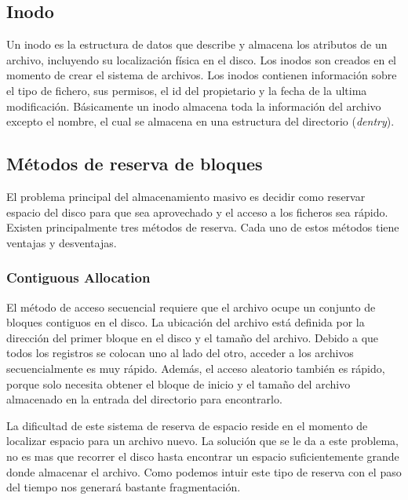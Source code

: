 \subsection{Inodo}
Un inodo es la estructura de datos que describe y almacena los atributos de un archivo, incluyendo su localización física en el disco. Los inodos son creados en el momento de crear el sistema de archivos. Los inodos contienen información sobre  el tipo de fichero, sus permisos, el id del propietario y la fecha de la ultima modificación. Básicamente un inodo almacena toda la información del archivo excepto el nombre, el cual se almacena en una estructura del directorio (\textit{dentry}).

\subsection{Métodos de reserva de bloques}
El problema principal del almacenamiento masivo es decidir como reservar espacio del disco para que sea aprovechado y el acceso a los ficheros sea rápido. Existen principalmente tres métodos de reserva. Cada uno de estos métodos tiene ventajas y desventajas. \cite{silberchatz}
\subsubsection{Contiguous Allocation}
El método de acceso secuencial requiere que el archivo ocupe un conjunto de bloques contiguos en el disco. La ubicación del archivo está definida por la dirección del primer bloque en el disco y el tamaño del archivo. Debido a que todos los registros se colocan uno al lado del otro, acceder a los archivos secuencialmente es muy rápido. Además, el acceso aleatorio también es rápido, porque solo necesita obtener el bloque de inicio y el tamaño del archivo almacenado en la entrada del directorio para encontrarlo. \cite{silberchatz}\\ 
\newpage

La dificultad de este sistema de reserva de espacio reside en el momento de localizar espacio para un archivo nuevo. La solución que se le da a este problema, no es mas que recorrer el disco hasta encontrar un espacio suficientemente grande donde almacenar el archivo. Como podemos intuir este tipo de reserva con el paso del tiempo nos generará bastante fragmentación.\cite{silberchatz}

